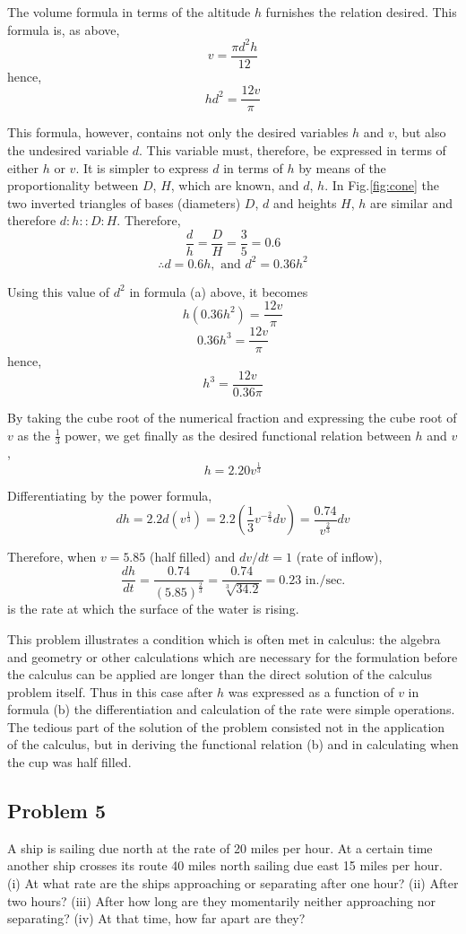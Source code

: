 The volume formula in terms of the altitude $h$ furnishes the relation desired. This formula is, as above,
\[v = \frac{\pi d^2h}{12}\]
hence,
\[h d^2 = \frac{12v}{\pi} \tag{a}\]

This formula, however, contains not only the desired variables $h$ and $v$, but also the undesired variable $d$. This variable must, therefore, be expressed in terms of either $h$ or $v$. It is simpler to express $d$ in terms of $h$ by means of the proportionality between $D$, $H$, which are known, and $d$, $h$. In Fig.\ref{fig:cone} the two inverted triangles of bases (diameters) $D$, $d$ and heights $H$, $h$ are similar and therefore $d : h :: D : H$. Therefore,
\[\frac{d}{h} = \frac{D}{H} = \frac{3}{5} = 0.6\]
\[\therefore d = 0.6h, \text{ and } d^2 = 0.36h^2\]

Using this value of $d^2$ in formula (a) above, it becomes
\[h(0.36h^2) = \frac{12v}{\pi}\]
\[0.36h^3 = \frac{12v}{\pi}\]
hence,
\[h^3 = \frac{12v}{0.36\pi}\]

By taking the cube root of the numerical fraction and expressing the cube root of $v$ as the $\frac{1}{3}$ power, we get finally as the desired functional relation between $h$ and $v$,
\[h = 2.20v^{\frac{1}{3}} \tag{b}\]

Differentiating by the power formula,
\[dh = 2.2d(v^{\frac{1}{3}}) = 2.2(\frac{1}{3}v^{-\frac{2}{3}}dv) = \frac{0.74}{v^{\frac{2}{3}}}dv\]

Therefore, when $v = 5.85$ (half filled) and $dv/dt = 1$ (rate of inflow),
\[\frac{dh}{dt} = \frac{0.74}{(5.85)^{\frac{2}{3}}} = \frac{0.74}{\sqrt[3]{34.2}} = 0.23\text{ in./sec.}\]
is the rate at which the surface of the water is rising.

This problem illustrates a condition which is often met in calculus: the algebra and geometry or other calculations which are necessary for the formulation before the calculus can be applied are longer than the direct solution of the calculus problem itself. Thus in this case after $h$ was expressed as a function of $v$ in formula (b) the differentiation and calculation of the rate were simple operations. The tedious part of the solution of the problem consisted not in the application of the calculus, but in deriving the functional relation (b) and in calculating when the cup was half filled.

\subsection*{Problem 5}
A ship is sailing due north at the rate of 20 miles per hour. At a certain time another ship crosses its route 40 miles north sailing due east 15 miles per hour. (i) At what rate are the ships approaching or separating after one hour? (ii) After two hours? (iii) After how long are they momentarily neither approaching nor separating? (iv) At that time, how far apart are they?

